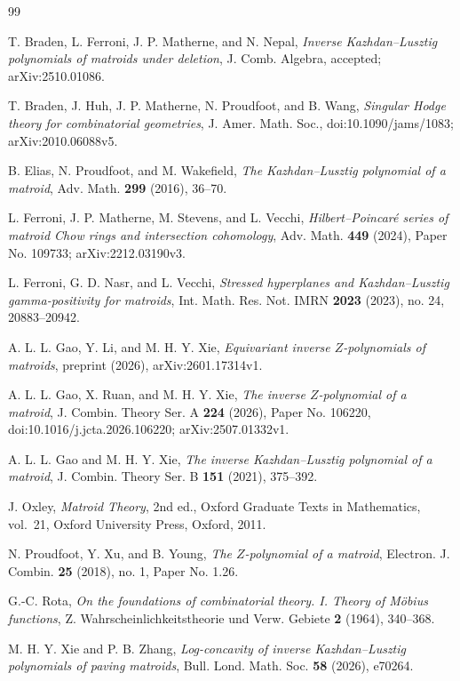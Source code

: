 \documentclass[11pt]{amsart}
\theoremstyle{definition}
\theoremstyle{remark}
\numberwithin{equation}{section}
\begin{document}
\begin{thebibliography}{99}

T. Braden, L. Ferroni, J. P. Matherne, and N. Nepal,
\emph{Inverse Kazhdan--Lusztig polynomials of matroids under deletion},
J. Comb. Algebra, accepted; arXiv:2510.01086.

T. Braden, J. Huh, J. P. Matherne, N. Proudfoot, and B. Wang,
\emph{Singular Hodge theory for combinatorial geometries},
J. Amer. Math. Soc., doi:10.1090/jams/1083; arXiv:2010.06088v5.

B. Elias, N. Proudfoot, and M. Wakefield,
\emph{The Kazhdan--Lusztig polynomial of a matroid},
Adv. Math. \textbf{299} (2016), 36--70.

L. Ferroni, J. P. Matherne, M. Stevens, and L. Vecchi,
\emph{Hilbert--Poincar\'e series of matroid Chow rings and intersection cohomology},
Adv. Math. \textbf{449} (2024), Paper No. 109733; arXiv:2212.03190v3.

L. Ferroni, G. D. Nasr, and L. Vecchi,
\emph{Stressed hyperplanes and Kazhdan--Lusztig gamma-positivity for matroids},
Int. Math. Res. Not. IMRN \textbf{2023} (2023), no. 24, 20883--20942.

A. L. L. Gao, Y. Li, and M. H. Y. Xie,
\emph{Equivariant inverse $Z$-polynomials of matroids},
preprint (2026), arXiv:2601.17314v1.

A. L. L. Gao, X. Ruan, and M. H. Y. Xie,
\emph{The inverse $Z$-polynomial of a matroid},
J. Combin. Theory Ser. A \textbf{224} (2026), Paper No. 106220, doi:10.1016/j.jcta.2026.106220; arXiv:2507.01332v1.

A. L. L. Gao and M. H. Y. Xie,
\emph{The inverse Kazhdan--Lusztig polynomial of a matroid},
J. Combin. Theory Ser. B \textbf{151} (2021), 375--392.

J. Oxley,
\emph{Matroid Theory}, 2nd ed.,
Oxford Graduate Texts in Mathematics, vol.~21, Oxford University Press, Oxford, 2011.

N. Proudfoot, Y. Xu, and B. Young,
\emph{The $Z$-polynomial of a matroid},
Electron. J. Combin. \textbf{25} (2018), no. 1, Paper No. 1.26.

G.-C. Rota,
\emph{On the foundations of combinatorial theory. I. Theory of M\"obius functions},
Z. Wahrscheinlichkeitstheorie und Verw. Gebiete \textbf{2} (1964), 340--368.

M. H. Y. Xie and P. B. Zhang,
\emph{Log-concavity of inverse Kazhdan--Lusztig polynomials of paving matroids},
Bull. Lond. Math. Soc. \textbf{58} (2026), e70264.

\end{thebibliography}
\end{document}
